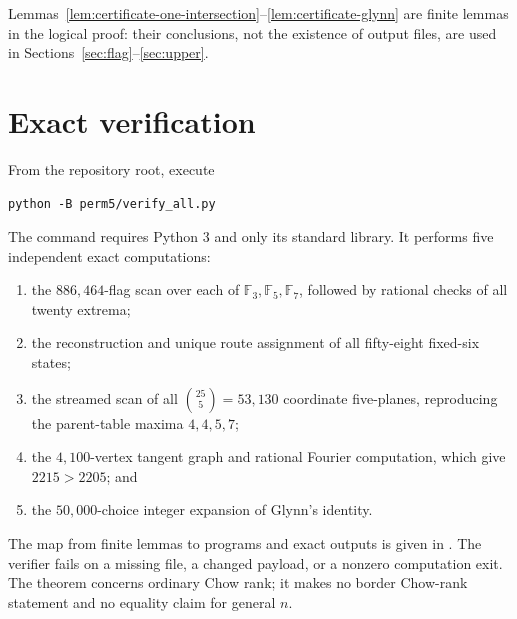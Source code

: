 \documentclass[11pt,reqno]{amsart}
\theoremstyle{definition}
\newcommand{\F}{\mathbb F}
\begin{document}
Lemmas~\ref{lem:certificate-one-intersection}--\ref{lem:certificate-glynn}
are finite lemmas in the logical proof: their conclusions, not the existence
of output files, are used in Sections~\ref{sec:flag}--\ref{sec:upper}.

\section{Exact verification}\label{sec:replay}

From the repository root, execute
\begin{verbatim}
python -B perm5/verify_all.py
\end{verbatim}
The command requires Python 3 and only its standard library. It performs five
independent exact computations:

\begin{enumerate}
\item the \(886{,}464\)-flag scan over each of \(\F_3,\F_5,\F_7\), followed by
rational checks of all twenty extrema;
\item the reconstruction and unique route assignment of all fifty-eight
fixed-six states;
\item the streamed scan of all \(\binom{25}{5}=53{,}130\) coordinate
five-planes, reproducing the parent-table maxima \(4,4,5,7\);
\item the \(4{,}100\)-vertex tangent graph and rational Fourier computation,
which give \(2215>2205\); and
\item the \(50{,}000\)-choice integer expansion of Glynn's identity.
\end{enumerate}
The map from finite lemmas to programs and exact outputs is given in
. The verifier fails on a missing file, a
changed payload, or a nonzero computation exit. The theorem concerns ordinary
Chow rank; it makes no border Chow-rank statement and no equality claim for
general \(n\).
\end{document}
